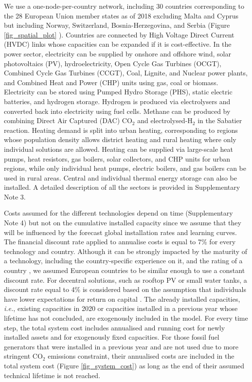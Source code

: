 \documentclass[5p]{elsarticle} %
\begin{document}
We use a one-node-per-country network, including 30 countries corresponding to the 28 European Union member states as of 2018 excluding Malta and Cyprus but including Norway, Switzerland, Bosnia-Herzegovina, and Serbia (Figure \ref{fig_spatial_plot} ). Countries are connected by High Voltage Direct Current (HVDC) links whose capacities can be expanded if it is cost-effective. In the power sector, electricity can be supplied by onshore and offshore wind, solar photovoltaics (PV), hydroelectricity, Open Cycle Gas Turbines (OCGT), Combined Cycle Gas Turbines (CCGT), Coal, Lignite, and Nuclear power plants, and Combined Heat and Power (CHP) units using gas, coal or biomass. Electricity can be stored using Pumped Hydro Storage (PHS), static electric batteries, and hydrogen storage. Hydrogen is produced via electrolysers and converted back into electricity using fuel cells. Methane can be produced by combining Direct Air Captured (DAC) CO$_2$ and electrolysed-H$_2$ in the Sabatier reaction. Heating demand is split into urban heating, corresponding to regions whose population density allows district heating and rural heating where only individual solutions are allowed. Heating can be supplied via large-scale heat pumps, heat resistors, gas boilers, solar collectors, and CHP units for urban regions, while only individual heat pumps, electric boilers, and gas boilers can be used in rural areas. Central and individual thermal energy storage can also be installed. A detailed description of all the sectors is provided in Supplementary Note 3. \

Costs assumed for the different technologies depend on time (Supplementary Note 4) but not on the cumulative installed capacity since we assume that they will be influenced by the forecast global installation rates and learning curves. The financial discount rate applied to annualise costs is equal to 7\% for every technology and country. Although it can be strongly impacted by the maturity of a technology, including the country-specific experience on it, and the rating of a country \cite{Egli_2019}, we assumed European countries to be similar enough to use a constant discount rate. For decentral solutions, such as rooftop PV or small water tanks, a discount rate equal to 4\% is considered based on the assumption that individuals have lower expectations for return on capital  \cite{individual_discount}. The already installed capacities, \textit{i.e.}, existing capacities in 2020 or capacities installed in a previous year whose lifetime has not concluded, are exogenously included in the model. For every time step, the total system cost includes annualised and running cost for newly installed assets and for exogenously fixed capacities. For those fossil fuel generators that were installed in a previous year and are not used due to more stringent CO$_2$ emissions constraint, their annualised costs are included in the total system cost (Figure \ref{fig_system_cost}) as long as the end of their assumed technical lifetime is not reached. 
\end{document}
